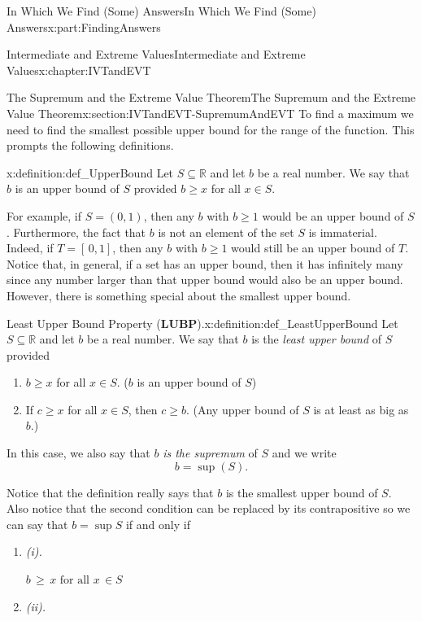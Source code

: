 \documentclass[oneside,10pt,]{book}
\newcommand{\terminology}[1]{\textbf{#1}}
\newcommand{\lititle}[1]{{\slshape#1}}
\numberwithin{equation}{section}
\begin{document}
\begin{partptx}{In Which We Find (Some) Answers}{}{In Which We Find (Some) Answers}{}{}{x:part:FindingAnswers}
\begin{chapterptx}{Intermediate and Extreme Values}{}{Intermediate and Extreme Values}{}{}{x:chapter:IVTandEVT}
\begin{sectionptx}{The Supremum and the Extreme Value Theorem}{}{The Supremum and the Extreme Value Theorem}{}{}{x:section:IVTandEVT-SupremumAndEVT}
To find a maximum we need to find the smallest possible upper bound for the range of the function. This prompts the following definitions.%
\begin{definition}{}{x:definition:def_UpperBound}%
 Let \(S\subseteq\mathbb{R}\) and let \(b\) be a real number. We say that \(b\) is an upper bound of \(S\) provided \(b\geq x\) for all \(x\in S\).%
\end{definition}
For example, if \(S=(0,1)\), then any \(b\) with \(b\geq 1\) would be an upper bound of \(S\). Furthermore, the fact that \(b\) is not an element of the set \(S\) is immaterial. Indeed, if \(T=[\,0,1]\), then any \(b\) with \(b\geq 1\) would still be an upper bound of \(T\). Notice that, in general, if a set has an upper bound, then it has infinitely many since any number larger than that upper bound would also be an upper bound. However, there is something special about the smallest upper bound.%
\begin{definition}{Least Upper Bound Property (\terminology{LUBP}).}{x:definition:def_LeastUpperBound}%
%
Let \(S\subseteq\mathbb{R}\) and let \(b\) be a real number.  We say that \(b\) is the \emph{least upper bound} of \(S\) provided%
\par
%
\begin{enumerate}[label=(\alph*)]
\item{}\(b\geq x\) for all \(x\in S\). (\(b\) is an upper bound of \(S\))%
\item{}If \(c\geq x\) for all \(x\in S\), then \(c\geq b\). (Any upper bound of \(S\) is at least as big as \(b\).)%
\end{enumerate}
%
\par
In this case, we also say that \(b\) \emph{is the supremum} of \(S\) and we write%
\begin{equation*}
b=\sup\left(S\right)\text{.}
\end{equation*}
%
\end{definition}
Notice that the definition really says that \(b\) is the smallest upper bound of \(S\). Also notice that the second condition can be replaced by its contrapositive so we can say that \(b=\sup S\) if and only if%
\begin{enumerate}[label=(\alph*)]
\item{}\lititle{(i).}\par%
\(\displaystyle b\,\geq\,x\text{ for all } x\,\in S\)%
\item{}\lititle{(ii).}\par%

\end{enumerate}
\end{sectionptx}
\end{chapterptx}
\end{partptx}
\end{document}
